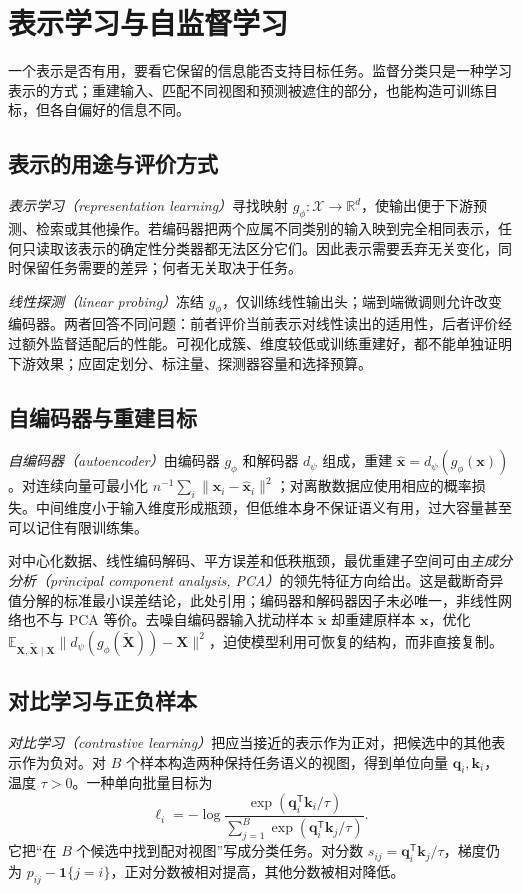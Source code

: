 \setcounter{chapter}{14} %
\chapter{表示学习与自监督学习}
\label{chap:dl-representation}
一个表示是否有用，要看它保留的信息能否支持目标任务。监督分类只是一种学习表示的方式；重建输入、匹配不同视图和预测被遮住的部分，也能构造可训练目标，但各自偏好的信息不同。

\section{表示的用途与评价方式}
\emph{表示学习（representation learning）}寻找映射 $g_\phi:\mathcal X\to\mathbb R^d$，使输出便于下游预测、检索或其他操作。若编码器把两个应属不同类别的输入映到完全相同表示，任何只读取该表示的确定性分类器都无法区分它们。因此表示需要丢弃无关变化，同时保留任务需要的差异；何者无关取决于任务。

\emph{线性探测（linear probing）}冻结 $g_\phi$，仅训练线性输出头；端到端微调则允许改变编码器。两者回答不同问题：前者评价当前表示对线性读出的适用性，后者评价经过额外监督适配后的性能。可视化成簇、维度较低或训练重建好，都不能单独证明下游效果；应固定划分、标注量、探测器容量和选择预算。

\section{自编码器与重建目标}
\emph{自编码器（autoencoder）}由编码器 $g_\phi$ 和解码器 $d_\psi$ 组成，重建 $\widehat{\mathbf x}=d_\psi(g_\phi(\mathbf x))$。对连续向量可最小化 $n^{-1}\sum_i\|\mathbf x_i-\widehat{\mathbf x}_i\|^2$；对离散数据应使用相应的概率损失。中间维度小于输入维度形成瓶颈，但低维本身不保证语义有用，过大容量甚至可以记住有限训练集。

对中心化数据、线性编码解码、平方误差和低秩瓶颈，最优重建子空间可由\emph{主成分分析（principal component analysis, PCA）}的领先特征方向给出。这是截断奇异值分解的标准最小误差结论，此处引用；编码器和解码器因子未必唯一，非线性网络也不与 PCA 等价。去噪自编码器输入扰动样本 $\widetilde{\mathbf x}$ 却重建原样本 $\mathbf x$，优化 $\mathbb E_{\mathbf X,\widetilde{\mathbf X}\mid\mathbf X}\|d_\psi(g_\phi(\widetilde{\mathbf X}))-\mathbf X\|^2$，迫使模型利用可恢复的结构，而非直接复制。

\section{对比学习与正负样本}
\emph{对比学习（contrastive learning）}把应当接近的表示作为正对，把候选中的其他表示作为负对。对 $B$ 个样本构造两种保持任务语义的视图，得到单位向量 $\mathbf q_i,\mathbf k_i$，温度 $\tau>0$。一种单向批量目标为
\begin{equation}
\ell_i=-\log\frac{\exp(\mathbf q_i^\mathsf T\mathbf k_i/\tau)}{\sum_{j=1}^B\exp(\mathbf q_i^\mathsf T\mathbf k_j/\tau)}.
\label{eq:dl-contrastive}
\end{equation}
它把“在 $B$ 个候选中找到配对视图”写成分类任务。对分数 $s_{ij}=\mathbf q_i^\mathsf T\mathbf k_j/\tau$，梯度仍为 $p_{ij}-\mathbf1\{j=i\}$，正对分数被相对提高，其他分数被相对降低。

